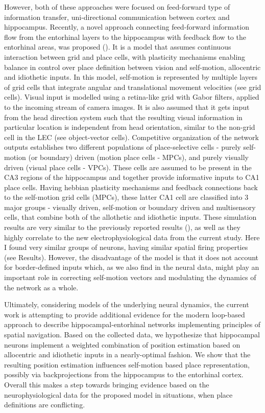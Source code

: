However, both of these approaches were focused on feed-forward type of information transfer, uni-directional communication between cortex and hippocampus. Recently, a novel approach connecting feed-forward information flow from the entorhinal layers to the hippocampus with feedback flow to the entorhinal areas, was proposed (\cite{Li2020}). It is a model that assumes continuous interaction between grid and place cells, with plasticity mechanisms enabling balance in control over place definition between vision and self-motion, allocentric and idiothetic inputs. In this model, self-motion is represented by multiple layers of grid cells that integrate angular and translational movement velocities (see grid cells). Visual input is modelled using a retina-like grid with Gabor filters, applied to the incoming stream of camera images. It is also assumed that it gets input from the head direction system such that the resulting visual information in particular location is independent from head orientation, similar to the non-grid cell in the LEC (see object-vector cells). Competitive organization of the network outputs establishes two different populations of place-selective cells - purely self-motion (or boundary) driven (motion place cells - MPCs), and purely visually driven (visual place cells - VPCs). These cells are assumed to be present in the CA3 regions of the hippocampus and together provide informative inputs to CA1 place cells. Having hebbian plasticity mechanisms and feedback connections back to the self-motion grid cells (MPCs), these latter CA1 cell are classified into 3 major groups - visually driven, self-motion or boundary driven and multisensory cells, that combine both of the allothetic and idiothetic inputs. These simulation results are very similar to the previously reported results (\cite{Haas2019}), as well as they highly correlate to the new electrophysiological data from the current study. Here I found very similar groups of neurons, having similar spatial firing properties (see Results). However, the disadvantage of the model is that it does not account for border-defined inputs which, as we also find in the neural data, might play an important role in correcting self-motion vectors and modulating the dynamics of the network as a whole.

Ultimately, considering models of the underlying neural dynamics, the current work is attempting to provide additional evidence for the modern loop-based approach to describe hippocampal-entorhinal networks implementing principles of spatial navigation. Based on the collected data, we hypothesize that hippocampal neurons implement a weighted combination of position estimation based on allocentric and idiothetic inputs in a nearly-optimal fashion. We show that the resulting position estimation influences self-motion based place representation, possibly via backprojections from the hippocampus to the entorhinal cortex. Overall this makes a step towards bringing evidence based on the neurophysiological data for the proposed model in situations, when place definitions are conflicting.


